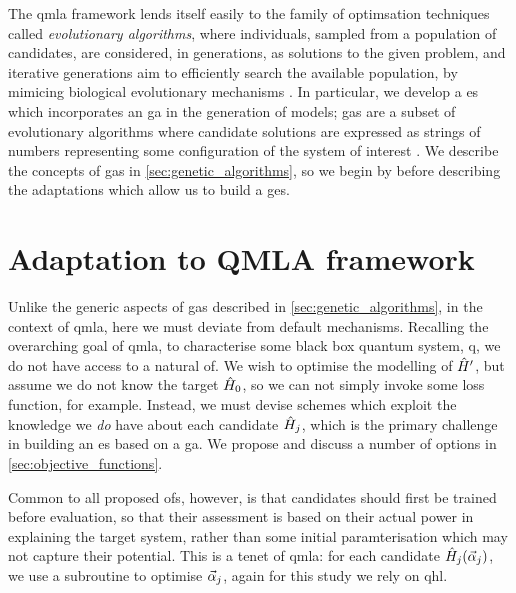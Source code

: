 The \gls{qmla} framework lends itself easily to the family of optimsation techniques called \emph{evolutionary algorithms}, 
    where individuals, sampled from a population of candidates, are considered, in generations, as solutions to the given problem,
    and iterative generations aim to efficiently search the available population, 
    by mimicing biological evolutionary mechanisms \cite{back1996evolutionary}. 
In particular, we develop a \gls{es} which incorporates an \gls{ga} in the generation of models;
    \glspl{ga} are a subset of evolutionary algorithms where candidate solutions are expressed as 
    strings of numbers representing some configuration of the system of interest \cite{holland1992adaptation}.
We describe the concepts of \glspl{ga} in \cref{sec:genetic_algorithms}, 
    so we begin by before describing the adaptations which allow us to build a \gls{ges}. 
\par 

\section{Adaptation to QMLA framework}\label{sec:ga_adaptation_to_qmla}
Unlike the generic aspects of \glspl{ga} described in \cref{sec:genetic_algorithms}, 
    in the context of \gls{qmla}, here we must deviate from default mechanisms. 
Recalling the overarching goal of \gls{qmla}, to characterise some black box quantum system, 
    \gls{q}, we do not have access to a natural \gls{of}.
We wish to optimise the modelling of $\hat{H}^{\prime}$, but assume we do not know the target $\hat{H}_0$, 
    so we can not simply invoke some loss function, for example. 
Instead, we must devise schemes which exploit the knowledge we \emph{do} have about each candidate $\hat{H}_j$, 
    which is the primary challenge in building an \gls{es} based on a \gls{ga}.  
We propose and discuss a number of options in \cref{sec:objective_functions}. 
\par 

Common to all proposed \glspl{of}, however, is that candidates should first be trained before evaluation, 
    so that their assessment is based on their actual power in explaining the target system, 
    rather than some initial paramterisation which may not capture their potential. 
This is a tenet of \gls{qmla}: for each candidate $\hat{H}_j ( \vec{\alpha}_j )$, we use a subroutine to optimise $\vec{\alpha}_j$, 
    again for this study we rely on \gls{qhl}. 

